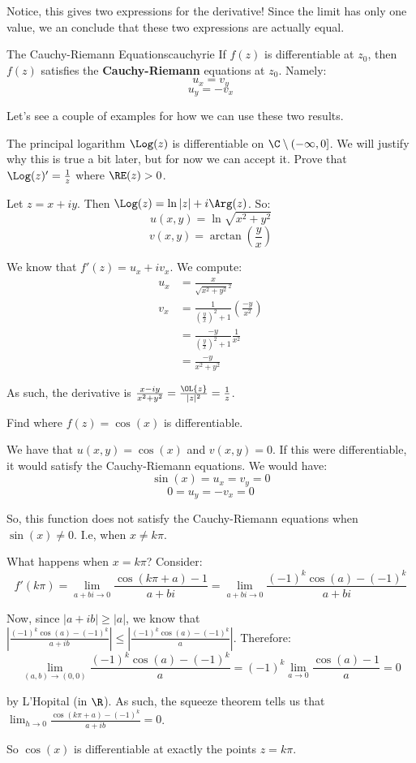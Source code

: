 Notice, this gives two expressions for the derivative! Since the limit has only one value, we an conclude that these two expressions are actually equal.

\begin{corbo}{The Cauchy-Riemann Equations}{cauchyrie}
If $f(z)$ is differentiable at $z_0$, then $f(z)$ satisfies the {\bf Cauchy-Riemann} equations at $z_0$. Namely:
$$u_x = v_y$$
$$u_y = -v_x$$
\end{corbo}

Let's see a couple of examples for how we can use these two results.

\begin{ex}{}{} The principal logarithm $\Log(z)$ is differentiable on $\C\setminus (-\infty,0]$. We will justify why this is true a bit later, but for now we can accept it. Prove that $\Log(z)' = \frac{1}{z}$ where $\RE(z) > 0$.

Let $z = x + iy$. Then $\Log(z) = \ln|z| + i\Arg(z)$. So:
$$u(x,y) = \ln \sqrt{x^2+ y^2}$$
$$v(x,y) = \arctan\left(\frac{y}{x}\right)$$

We know that $f'(z) = u_x + iv_x$. We compute:
\begin{align*}u_x &= \frac{x}{\sqrt{x^2 + y^2}^2}\\
v_x &= \frac{1}{\left(\frac{y}{x}\right)^2 + 1}\left(\frac{-y}{x^2}\right)\\
&= \frac{-y}{\left(\frac{y}{x}\right)^2 + 1}\frac{1}{x^2}\\
&= \frac{-y}{x^2 + y^2}
\end{align*}

As such, the derivative is $\frac{x - iy}{x^2 + y^2} = \frac{\OL{z}}{|z|^2} = \frac{1}{z}$.
\end{ex}

\begin{ex}{}{} Find where $f(z) = \cos(x)$ is differentiable.

We have that $u(x,y) = \cos(x)$ and $v(x,y) = 0$. If this were differentiable, it would satisfy the Cauchy-Riemann equations. We would have:
$$\sin(x) = u_x = v_y = 0$$
$$0 = u_y = -v_x = 0$$

So, this function does not satisfy the Cauchy-Riemann equations when $\sin(x) \ne 0$. I.e, when $x\ne k\pi$.

What happens when $x = k\pi$? Consider:
$$f'(k\pi) = \lim_{a+bi\rightarrow 0} \frac{\cos(k\pi + a) - 1}{a+bi} = \lim_{a+bi\rightarrow 0} \frac{(-1)^k\cos(a) - (-1)^k}{a+bi} $$

Now, since $|a+ib| \ge |a|$, we know that $\left|\frac{(-1)^k\cos(a) - (-1)^k}{a+ib}\right| \le \left|\frac{(-1)^k\cos(a) - (-1)^k}{a}\right|$. Therefore:
$$\lim_{(a,b)\rightarrow (0,0)} \frac{(-1)^k\cos(a) - (-1)^k}{a} = (-1)^k \lim_{a\rightarrow 0} \frac{\cos(a) - 1}{a} = 0$$

\noin by L'Hopital (in $\R$). As such, the squeeze theorem tells us that $\lim_{h\rightarrow 0} \frac{\cos(k\pi + a) - (-1)^k}{a + ib} = 0$.

So $\cos(x)$ is differentiable at exactly the points $z = k\pi$.

\end{ex}

